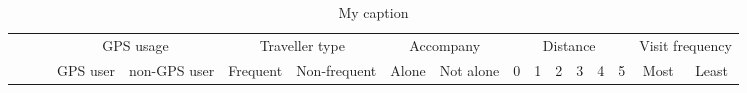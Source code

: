 \documentclass{sigchi}
\begin{document}

\begin{table}[t]
	\centering
	\caption{My caption}
	\begin{adjustbox}{width=1\textwidth}
		\small
		\label{my-label}
		\begin{tabular}{ccccccccccccccccc}
			\cline{4-17}
			\multicolumn{1}{c}{}                                 & \multicolumn{1}{c}{}                         & \multicolumn{1}{c|}{}      & \multicolumn{2}{c|}{GPS usage}                                                                                       & \multicolumn{2}{c|}{Traveller type}                                                                                  & \multicolumn{2}{c|}{Accompany}                                                                                               & \multicolumn{6}{c|}{Distance}                                                                                                                                                                                                                                                                                                            & \multicolumn{2}{c|}{Visit frequency}                                                                                 \\ \cline{4-17} 
			\multicolumn{1}{c}{}                                 & \multicolumn{1}{c}{}                         & \multicolumn{1}{c|}{}      & \multicolumn{1}{c|}{GPS user}                             & \multicolumn{1}{c|}{non-GPS user}                        & \multicolumn{1}{c|}{Frequent}                             & \multicolumn{1}{c|}{Non-frequent}                        & \multicolumn{1}{c|}{Alone}                                     & \multicolumn{1}{c|}{Not alone}                              & \multicolumn{1}{c|}{0}                                & \multicolumn{1}{c|}{1}                               & \multicolumn{1}{c|}{2}                               & \multicolumn{1}{c|}{3}                               & \multicolumn{1}{c|}{4}                               & \multicolumn{1}{c|}{5}                               & \multicolumn{1}{c|}{Most}                                 & \multicolumn{1}{c|}{Least}                               \\ \hline

\end{tabular}
\end{adjustbox}
\end{table}
\end{document}
